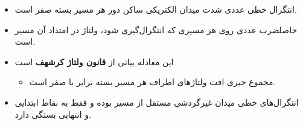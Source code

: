 \begin{ELunit}

\begin{itemize}
\tightlist
\item
  انتگرال خطی عددی شدت میدان الکتریکی ساکن دور هر مسیر بسته صفر است.
\item
  حاصلضرب عددی  روی هر مسیری که انتگرال‌گیری شود، ولتاژ در امتداد آن مسیر است.
\item
  این معادله بیانی از \textbf{قانون ولتاژ کرشهف} است

  \begin{itemize}
  \tightlist
  \item
    مجموع جبری افت ولتاژهای اطراف هر مسیر بسته برابر با صفر است.
  \end{itemize}
\item
  انتگرال‌های خطی میدان غیرگردشی  مستقل از مسیر بوده و فقط به نقاط ابتدایی و انتهایی بستگی دارد.
\end{itemize}



\end{ELunit}

\ELhold


